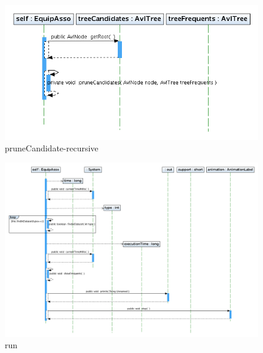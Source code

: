 \newpage
\begin{figure}
\centering
\includegraphics[width=1.2\textwidth]{imgsSecuencia/EquipAsso/pruneCandidates.png}
\caption{pruneCandidate-recursive}
\end{figure}
\newpage
\begin{figure}
\centering
\includegraphics[width=1.2\textwidth]{imgsSecuencia/EquipAsso/run.png}
\caption{run}
\end{figure}
\newpage

